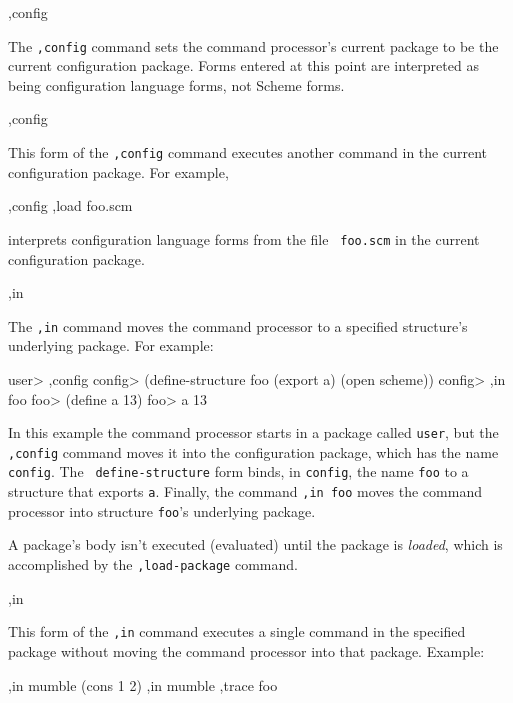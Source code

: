 \begin{list}{}{}{}

\item
\begin{code}
,config
\end{code}
    The {\tt,config} command sets the command processor's current
    package to be the current configuration package.  Forms entered at
    this point are interpreted as being configuration language forms,
    not Scheme forms.

\item
\begin{code}
,config 
\end{code}
    This form of the {\tt,config} command executes another command in
    the current configuration package.  For example,
\begin{code}
    ,config ,load foo.scm
\end{code}
    interprets configuration language forms from the file {\tt
    foo.scm} in the current configuration package.

\item
\begin{code}
,in 
\end{code}
    The {\tt ,in} command moves the command processor to a specified
    structure's underlying package.  For example:
\begin{code}
    user> ,config
    config> (define-structure foo (export a)
              (open scheme))
    config> ,in foo
    foo> (define a 13)
    foo> a
    13
\end{code}
    In this example the command processor starts in a package called
    {\tt user}, but the {\tt ,config} command moves it into the
    configuration package, which has the name {\tt config}.  The {\tt
    define-structure} form binds, in {\tt config}, the name {\tt foo} to
    a structure that exports {\tt a}.  Finally, the command {\tt ,in
    foo} moves the command processor into structure {\tt foo}'s
    underlying package.

    A package's body isn't executed (evaluated) until the package is
    {\em loaded}, which is accomplished by the {\tt ,load-package}
    command.

\item
\begin{code}
,in  
\end{code}
    This form of the {\tt,in} command executes a single command in the
    specified package without moving the command processor into that
    package.  Example:
\begin{code}
    ,in mumble (cons 1 2)
    ,in mumble ,trace foo
\end{code}


\end{list}
